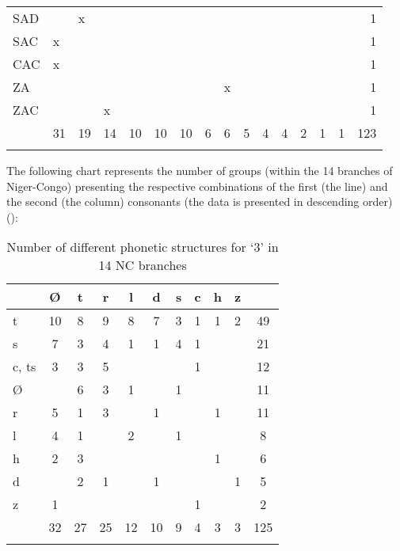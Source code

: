 \begin{table}
\begin{tabularx}{\textwidth}{lXXXXXXXXXXXXXXr}
{SAD} &  & {x} &  &  &  &  &  &  &  &  &  &  &  &  & {1}\\
{SAC} & {x} &  &  &  &  &  &  &  &  &  &  &  &  &  & {1}\\
{CAC} & {x} &  &  &  &  &  &  &  &  &  &  &  &  &  & {1}\\
{ZA} &  &  &  &  &  &  &  & {x} &  &  &  &  &  &  & {1}\\
{ZAC} &  &  & {x} &  &  &  &  &  &  &  &  &  &  &  & {1}\\
\midrule
& {{31}} & {{19}} & {{14}} & {{10}} & {{10}} & {{10}} & {{6}} & {{6}} & {{5}} & {{4}} & {{4}} & {{2}} & {{1}} & {{1}} & {{123}}\\
\lspbottomrule
\end{tabularx}
\end{table}

The following chart represents the number of groups (within the 14 branches of Niger-Congo) presenting the respective combinations of the first (the line) and the second (the column) consonants (the data is presented in descending order) ():

\begin{table}
\caption{\label{tab:4:12}Number of different phonetic structures for `3' in 14 NC branches} 


\begin{tabularx}{.8\textwidth}{lSSSSSSSSSS}
\lsptoprule

~ & Ø & t & r & l & d & s & c & h & z & {~}\\
\midrule 
t & 10 & 8 & 9 & 8 & 7 & 3 & 1 & 1 & 2 & {49}\\
s & 7 & 3 & 4 & 1 & 1 & 4 & 1 & ~ & ~ & {21}\\
c, ts & 3 & 3 & 5 & ~ & ~ & ~ & 1 & ~ & ~ & {12}\\
Ø & ~ & 6 & 3 & 1 & ~ & 1 & ~ & ~ & ~ & {11}\\
r & 5 & 1 & 3 & ~ & 1 & ~ & ~ & 1 & ~ & {11}\\
l & 4 & 1 & ~ & 2 & ~ & 1 & ~ & ~ & ~ & {8}\\
h & 2 & 3 & ~ & ~ & ~ & ~ & ~ & 1 & ~ & {6}\\
d & ~ & 2 & 1 & ~ & 1 & ~ & ~ & ~ & 1 & {5}\\
z & 1 & ~ & ~ & ~ & ~ & ~ & 1 & ~ & ~ & {2}\\
\midrule
~ & {32} & {27} & {25} & {12} & {10} & {9} & {4} & {3} & {3} & {125}\\
\lspbottomrule
\end{tabularx}
\end{table}

